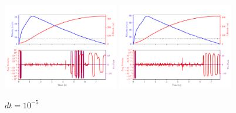 \documentclass{amsdtx}
\begin{document}
\begin{figure}[H]
\centering
\includegraphics[width=0.45\textwidth]{bib/figures_for_readme/RK4_dt_0p00001.pdf}
\includegraphics[width=0.45\textwidth]{bib/figures_for_readme/RK6_dt_0p00001.pdf}
\caption{$dt=10^{-5}$}
\end{figure}
\end{document}
